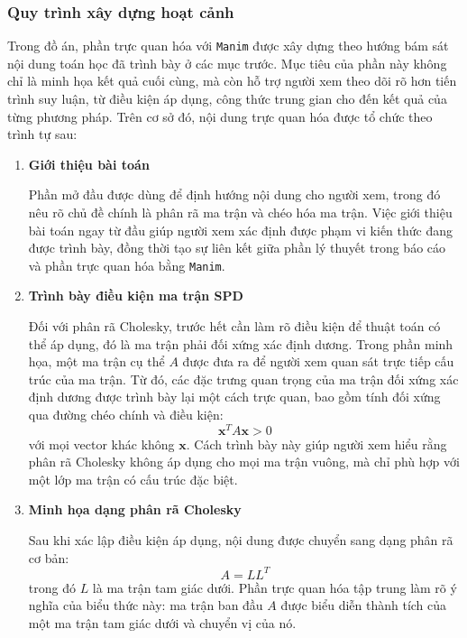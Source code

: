 \documentclass[12pt,a4paper]{article}
\begin{document}
\subsubsection{Quy trình xây dựng hoạt cảnh}
Trong đồ án, phần trực quan hóa với \texttt{Manim} được xây dựng theo hướng bám sát nội dung toán học đã trình bày ở các mục trước. Mục tiêu của phần này không chỉ là minh họa kết quả cuối cùng, mà còn hỗ trợ người xem theo dõi rõ hơn tiến trình suy luận, từ điều kiện áp dụng, công thức trung gian cho đến kết quả của từng phương pháp. Trên cơ sở đó, nội dung trực quan hóa được tổ chức theo trình tự sau:


\begin{enumerate}[label=\textbf{\alph*) Bước \arabic*:}, leftmargin=*, align=left]

\item \textbf{Giới thiệu bài toán}

Phần mở đầu được dùng để định hướng nội dung cho người xem, trong đó nêu rõ chủ đề chính là phân rã ma trận và chéo hóa ma trận. Việc giới thiệu bài toán ngay từ đầu giúp người xem xác định được phạm vi kiến thức đang được trình bày, đồng thời tạo sự liên kết giữa phần lý thuyết trong báo cáo và phần trực quan hóa bằng \texttt{Manim}.

\item \textbf{Trình bày điều kiện ma trận SPD}

Đối với phân rã Cholesky, trước hết cần làm rõ điều kiện để thuật toán có thể áp dụng, đó là ma trận phải đối xứng xác định dương. Trong phần minh họa, một ma trận cụ thể $A$ được đưa ra để người xem quan sát trực tiếp cấu trúc của ma trận. Từ đó, các đặc trưng quan trọng của ma trận đối xứng xác định dương được trình bày lại một cách trực quan, bao gồm tính đối xứng qua đường chéo chính và điều kiện:
\begin{equation}
\mathbf{x}^T A \mathbf{x} > 0
\end{equation}
với mọi vector khác không $\mathbf{x}$. Cách trình bày này giúp người xem hiểu rằng phân rã Cholesky không áp dụng cho mọi ma trận vuông, mà chỉ phù hợp với một lớp ma trận có cấu trúc đặc biệt.

\item \textbf{Minh họa dạng phân rã Cholesky}

Sau khi xác lập điều kiện áp dụng, nội dung được chuyển sang dạng phân rã cơ bản:
\begin{equation}
A = L L^T
\end{equation}
trong đó $L$ là ma trận tam giác dưới. Phần trực quan hóa tập trung làm rõ ý nghĩa của biểu thức này: ma trận ban đầu $A$ được biểu diễn thành tích của một ma trận tam giác dưới và chuyển vị của nó.


\end{enumerate}
\end{document}
